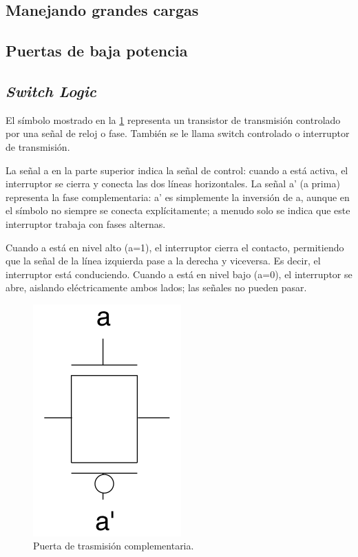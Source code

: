 \subsection{Manejando grandes cargas}

\subsection{Puertas de baja potencia}

\subsection{\textit{Switch Logic}}


El símbolo mostrado en la  \cref{Fig:02-switch} representa un transistor de transmisión controlado por una señal de reloj o fase. También se le llama switch controlado o interruptor de transmisión.

La señal a en la parte superior indica la señal de control: cuando a está activa, el interruptor se cierra y conecta las dos líneas horizontales. La señal a' (a prima) representa la fase complementaria: a' es simplemente la inversión de a, aunque en el símbolo no siempre se conecta explícitamente; a menudo solo se indica que este interruptor trabaja con fases alternas.

Cuando a está en nivel alto (a=1), el interruptor cierra el contacto, permitiendo que la señal de la línea izquierda pase a la derecha y viceversa. Es decir, el interruptor está conduciendo. Cuando a está en nivel bajo (a=0), el interruptor se abre, aislando eléctricamente ambos lados; las señales no pueden pasar.

\begin{figure}[H] \centering
    \includegraphics[width=0.3\linewidth]{Imagenes/02/02-Switch}
    \caption{Puerta de trasmisión complementaria.}
    \label{Fig:02-switch}
\end{figure}

